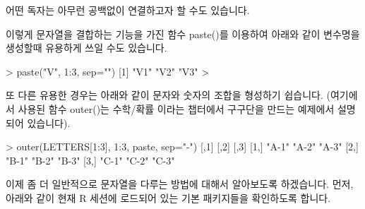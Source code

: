 \documentclass[tutorial.tex]{subfiles}
\begin{document}
어떤 독자는 아무런 공백없이 연결하고자 할 수도 있습니다. 

\begin{Schunk}
\end{Schunk}

이렇게 문자열을 결합하는 기능을 가진 함수 paste()를 이용하여 아래와 같이 변수명을 생성할때 유용하게 쓰일 수도 있습니다. 

\begin{Schunk}
\begin{Soutput}
> paste("V", 1:3, sep="")
[1] "V1" "V2" "V3"
> 
\end{Soutput}
\end{Schunk}

또 다른 유용한 경우는 아래와 같이 문자와 숫자의 조합을 형성하기 쉽습니다. 
(여기에서 사용된 함수 outer()는 수학/확률 이라는 챕터에서 구구단을 만드는 예제에서 설명되어 있습니다).

\begin{Schunk}
\begin{Soutput}
> outer(LETTERS[1:3], 1:3, paste, sep="-")
     [,1]  [,2]  [,3] 
[1,] "A-1" "A-2" "A-3"
[2,] "B-1" "B-2" "B-3"
[3,] "C-1" "C-2" "C-3"
\end{Soutput}
\end{Schunk}

\begin{comment}
\begin{Schunk}
\begin{Soutput}
> lower.tri(outer(LETTERS[1:3], 1:3, paste, sep="-"))
      [,1]  [,2]  [,3]
[1,] FALSE FALSE FALSE
[2,]  TRUE FALSE FALSE
[3,]  TRUE  TRUE FALSE

> upper.tri(outer(LETTERS[1:3], 1:3, paste, sep="-"))
      [,1]  [,2]  [,3]
[1,] FALSE  TRUE  TRUE
[2,] FALSE FALSE  TRUE
[3,] FALSE FALSE FALSE
> 
\end{Soutput}
\end{Schunk}	
\end{comment}

이제 좀 더 일반적으로 문자열을 다루는 방법에 대해서 알아보도록 하겠습니다.
먼저, 아래와 같이 현재 R 세션에 로드되어 있는 기본 패키지들을 확인하도록 합니다.
\end{document}
